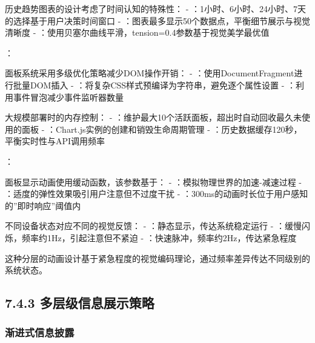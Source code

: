 
历史趋势图表的设计考虑了时间认知的特殊性： - ：1小时、6小时、24小时、7天的选择基于用户决策时间窗口 - ：图表最多显示50个数据点，平衡细节展示与视觉清晰度 - ：使用贝塞尔曲线平滑，tension=0.4参数基于视觉美学最优值

：


面板系统采用多级优化策略减少DOM操作开销： - ：使用DocumentFragment进行批量DOM插入 - ：将复杂CSS样式预编译为字符串，避免逐个属性设置 - ：利用事件冒泡减少事件监听器数量


大规模部署时的内存控制： - ：维护最大10个活跃面板，超出时自动回收最久未使用的面板 - ：Chart.js实例的创建和销毁生命周期管理 - ：历史数据缓存120秒，平衡实时性与API调用频率

：


面板显示动画使用缓动函数，该参数基于： - ：模拟物理世界的加速-减速过程 - ：适度的弹性效果吸引用户注意但不过度干扰 - ：300ms的动画时长位于用户感知的''即时响应''阈值内


不同设备状态对应不同的视觉反馈： - ：静态显示，传达系统稳定运行 - ：缓慢闪烁，频率约1Hz，引起注意但不紧迫 - ：快速脉冲，频率约2Hz，传达紧急程度

这种分层的动画设计基于紧急程度的视觉编码理论，通过频率差异传达不同级别的系统状态。

\hypertarget{ux591aux5c42ux7ea7ux4fe1ux606fux5c55ux793aux7b56ux7565}{%
\subsection{7.4.3 多层级信息展示策略}\label{ux591aux5c42ux7ea7ux4fe1ux606fux5c55ux793aux7b56ux7565}}

\hypertarget{ux6e10ux8fdbux5f0fux4fe1ux606fux62abux9732}{%
\subsubsection{渐进式信息披露}\label{ux6e10ux8fdbux5f0fux4fe1ux606fux62abux9732}}

